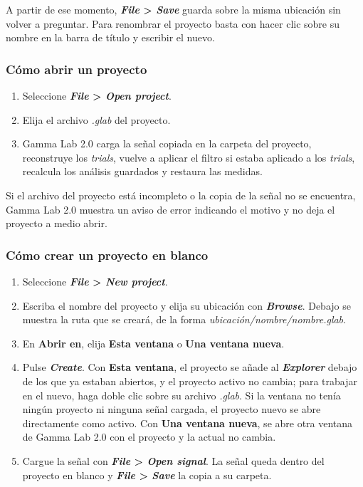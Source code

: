 \documentclass[11pt,a4paper]{article}
\begin{document}
    A partir de ese momento, \textbf{\textit{File} > \textit{Save}} guarda sobre la misma ubicaci\'on sin volver a preguntar. Para renombrar el proyecto basta con hacer clic sobre su nombre en la barra de t\'itulo y escribir el nuevo.

    \subsubsection*{C\'omo abrir un proyecto}
    \begin{enumerate}
        \item Seleccione \textbf{\textit{File} > \textit{Open project}}.
        \item Elija el archivo \textit{.glab} del proyecto.
        \item Gamma Lab 2.0 carga la se\~nal copiada en la carpeta del proyecto, reconstruye los \textit{trials}, vuelve a aplicar el filtro si estaba aplicado a los \textit{trials}, recalcula los an\'alisis guardados y restaura las medidas.
    \end{enumerate}

    Si el archivo del proyecto est\'a incompleto o la copia de la se\~nal no se encuentra, Gamma Lab 2.0 muestra un aviso de error indicando el motivo y no deja el proyecto a medio abrir.

    \subsubsection*{C\'omo crear un proyecto en blanco}
    \begin{enumerate}
        \item Seleccione \textbf{\textit{File} > \textit{New project}}.
        \item Escriba el nombre del proyecto y elija su ubicaci\'on con \textbf{\textit{Browse}}. Debajo se muestra la ruta que se crear\'a, de la forma \textit{ubicaci\'on/nombre/nombre.glab}.
        \item En \textbf{Abrir en}, elija \textbf{Esta ventana} o \textbf{Una ventana nueva}.
        \item Pulse \textbf{\textit{Create}}. Con \textbf{Esta ventana}, el proyecto se a\~nade al \textbf{\textit{Explorer}} debajo de los que ya estaban abiertos, y el proyecto activo no cambia; para trabajar en el nuevo, haga doble clic sobre su archivo \textit{.glab}. Si la ventana no ten\'ia ning\'un proyecto ni ninguna se\~nal cargada, el proyecto nuevo se abre directamente como activo. Con \textbf{Una ventana nueva}, se abre otra ventana de Gamma Lab 2.0 con el proyecto y la actual no cambia.
        \item Cargue la se\~nal con \textbf{\textit{File} > \textit{Open signal}}. La se\~nal queda dentro del proyecto en blanco y \textbf{\textit{File} > \textit{Save}} la copia a su carpeta.
    \end{enumerate}
\end{document}
